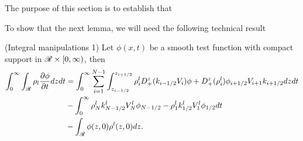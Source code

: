 The purpose of this section is to establish that 


To show that the next lemma, we will need the following technical result
\begin{proposition}(Integral manipulations 1) \label{prop:int_man_1}
	Let $\phi(x,t)$ be a smooth test function with compact support in $\mathscr{R} \times [0,\infty)$, then 
	\begin{align}
		\int_0^{\infty} \int_{\mathscr{R}}\rho_l \frac{\partial \phi}{\partial t} dz dt &= \int_0^{\infty} \sum_{i = 1}^{N-1} \int_{z_{i-1/2}}^{z_{i+1/2}} \rho^l_i D_+^z(k_{i-1/2} V_i
		) \phi + D^z_+(\rho^l_i) \phi_{i+1/2}V_{i+1}k_{i+1/2} dzdt \label{lemma:int_man_1:sum_term} \\ \quad &- \int_0^{\infty} \rho^l_N k^l_{N-1/2} V^l_N  \phi_{N-1/2} - \rho^l_1 k^l_{1/2} V^l_1 \phi_{1/2} dt \label{lemma:int_man_1:bdry_term}\\
		&- \int_{\mathscr{R}} \phi(z,0) \rho^l(z,0) dz. \label{lemma:int_man_1:init_cond}
	\end{align}
	
\end{proposition}

